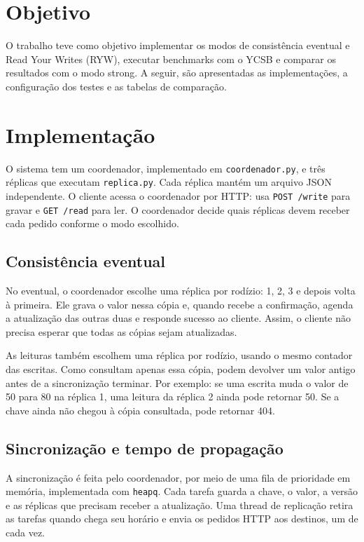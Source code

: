 \section{Objetivo}
O trabalho teve como objetivo implementar os modos de consistência eventual
e Read Your Writes (RYW), executar benchmarks com o YCSB e comparar os
resultados com o modo strong. A seguir, são apresentadas as implementações,
a configuração dos testes e as tabelas de comparação.

\section{Implementação}
O sistema tem um coordenador, implementado em \texttt{coordenador.py}, e três
réplicas que executam \texttt{replica.py}. Cada réplica mantém um arquivo JSON
independente. O cliente acessa o coordenador por HTTP: usa
\texttt{POST /write} para gravar e \texttt{GET /read} para ler. O coordenador
decide quais réplicas devem receber cada pedido conforme o modo escolhido.

\subsection{Consistência eventual}
No eventual, o coordenador escolhe uma réplica por rodízio: 1, 2, 3 e depois
volta à primeira. Ele grava o valor nessa cópia e, quando recebe a confirmação,
agenda a atualização das outras duas e responde sucesso ao cliente.
Assim, o cliente não precisa esperar que todas as cópias sejam atualizadas.

As leituras também escolhem uma réplica por rodízio, usando o mesmo contador
das escritas. Como consultam apenas essa cópia, podem devolver um valor
antigo antes de a sincronização terminar. Por exemplo: se uma escrita muda
o valor de 50 para 80 na réplica 1, uma leitura da réplica 2 ainda pode
retornar 50. Se a chave ainda não chegou à cópia consultada, pode retornar 404.

\subsection{Sincronização e tempo de propagação}
A sincronização é feita pelo coordenador, por meio de uma fila de prioridade
em memória, implementada com \texttt{heapq}. Cada tarefa guarda a chave,
o valor, a versão e as réplicas que precisam receber a atualização. Uma
thread de replicação retira as tarefas quando chega seu horário e envia
os pedidos HTTP aos destinos, um de cada vez.

